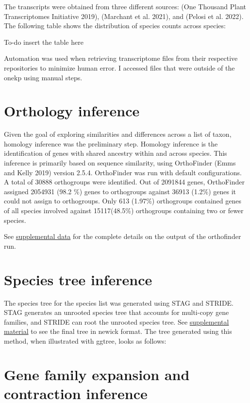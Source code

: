 The transcripts were obtained from three different sources: (One Thousand Plant Transcriptomes Initiative 2019), (Marchant et al. 2021), and (Pelosi et al. 2022). 
The following table shows the distribution of species counts across species:

To-do insert the table here

Automation was used when retrieving transcriptome files from their respective repositories to minimize human error. I accessed files that were outside of the onekp using manual steps.

\section{Orthology inference}

Given the goal of exploring similarities and differences across a list of taxon, homology inference was the preliminary step. Homology inference is the identification of genes with shared ancestry within and across species. This inference is primarily based on sequence similarity, using OrthoFinder (Emms and Kelly 2019) version 2.5.4. OrthoFinder was run with default configurations. A total of 30888 orthogroups were identified. Out of 2091844 genes, OrthoFinder assigned 2054931 (98.2 \%) genes to orthogroups against 36913 (1.2\%) genes it could not assign to orthogroups. 
Only 613 (1.97\%) orthogroups contained genes of all species involved against 15117(48.5\%) orthogroups containing two or fewer species.

See \href{https://uah0-my.sharepoint.com/:u:/g/personal/rrd0009_uah_edu/EYwE1_Ily2tEgZk_5hVrbNEBbfiQMsVX4kDM_fsiLFfW1w?e=JTC0gY}{supplemental data} for the complete details on the output of the orthofinder run.

\section{Species tree inference}

The species tree for the species list was generated using STAG and STRIDE. STAG generates an unrooted species tree that accounts for multi-copy gene families, and STRIDE can root the unrooted species tree. See \href{https://uah0-my.sharepoint.com/:t:/g/personal/rrd0009_uah_edu/EZEuafSHfk1OpZBgF09rZcgBoKeu_35QB_noYEs5zCyLQg?e=De2IOj}{supplemental material} to see the final tree in newick format. The tree generated using this method, when illustrated with ggtree, looks as follows:

\section{Gene family expansion and contraction inference}

